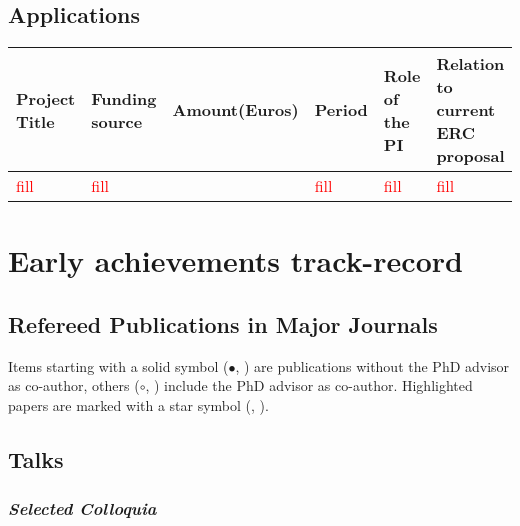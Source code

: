 \documentclass[STG]{ercgrant}
\begin{document}
\subsection*{Applications}
\begin{footnotesize}
	\def\arraystretch{1.5}
	\begin{tabular}{|p{3.9cm}|p{1.6cm}|p{1.5cm}|p{2.4cm}|p{2.7cm}|p{2.2cm}|}
		\hline
		\rowcolor{black!20} \bf Project Title & \bf  Funding source   & \bf
		Amount\newline(Euros)                 & \bf Period            & \bf Role of the PI       & \bf Relation to \newline current ERC \newline proposal                                                 \\
		\hline
		\textcolor{red}{fill}                 & \textcolor{red}{fill} & \textcolor{red}{\EUR{1}} & \textcolor{red}{fill}                                  & \textcolor{red}{fill} & \textcolor{red}{fill}
		\\
		\hline
	\end{tabular}
\end{footnotesize}

\newpage
\section{Early achievements track-record}

\subsection*{Refereed Publications in Major Journals}
Items starting with a solid symbol ($\bullet$, \fstar) are publications without the PhD advisor as
co-author, others ($\circ$, \ostar) include the PhD advisor as co-author. Highlighted papers are
marked with a star symbol (\ostar, \fstar).\\

\begin{itemize}[topsep=0pt,itemsep=0.62ex,partopsep=0ex,parsep=0.5ex]
	
\end{itemize}

\subsection*{Talks}
\subsubsection*{\textit{Selected Colloquia}}
\end{document}
